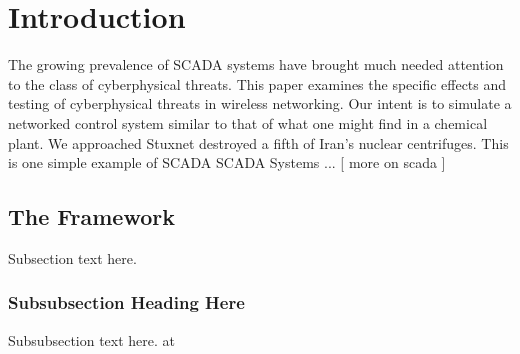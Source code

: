 \section{Introduction}
The growing prevalence of SCADA systems have brought much needed attention to the class of cyberphysical threats.  This paper examines the specific effects and testing of cyberphysical threats in wireless networking.  Our intent is to simulate a networked control system similar to that of what one might find in a chemical plant. We approached
Stuxnet destroyed a fifth of Iran's nuclear centrifuges.  This is one simple example of SCADA 
SCADA Systems ... [ more on scada ]



\subsection{The Framework}
Subsection text here.



\subsubsection{Subsubsection Heading Here}
Subsubsection text here.
at